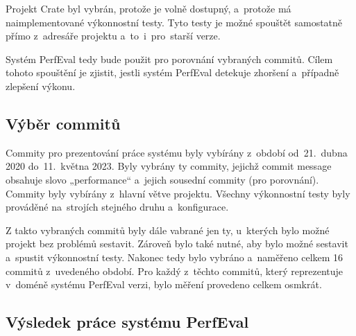 Projekt Crate byl vybrán, protože je volně dostupný, a~protože má naimplementované výkonnostní testy.
Tyto testy je možné spouštět samostatně přímo z~adresáře projektu a~to~i~pro~starší verze.

Systém PerfEval tedy bude použit pro porovnání vybraných commitů. Cílem tohoto
spouštění je zjistit, jestli systém PerfEval detekuje zhoršení a~případně zlepšení
výkonu.

\subsection{Výběr commitů}

Commity pro prezentování práce systému byly vybírány z~období od~21.~dubna 2020 do~11.~května 2023.
Byly vybrány ty commity, jejichž commit message obsahuje slovo „performance“ a~jejich sousední commity (pro porovnání).
Commity byly vybírány z~hlavní větve projektu. Všechny výkonnostní testy byly prováděné na~strojích stejného druhu a~konfigurace.

Z takto vybraných commitů byly dále vabrané jen ty, u~kterých bylo možné projekt bez problémů sestavit. Zároveň bylo také nutné,
aby bylo možné sestavit a~spustit výkonnostní testy. Nakonec tedy bylo vybráno a~naměřeno celkem 16 commitů z~uvedeného období.
Pro každý z~těchto commitů, který reprezentuje v~doméně systému PerfEval verzi, bylo měření provedeno celkem osmkrát.

\subsection{Výsledek práce systému PerfEval}
